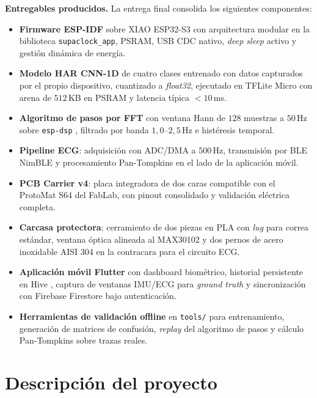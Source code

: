 \documentclass[letterpaper,11pt]{article}
\begin{document}
\vspace{0.2cm}
\noindent\textbf{Entregables producidos.} La entrega final consolida los siguientes componentes:
\begin{itemize}
    \item \textbf{Firmware ESP-IDF} sobre XIAO ESP32-S3 con arquitectura modular en la biblioteca \texttt{supaclock\_app}, PSRAM, USB CDC nativo, \textit{deep sleep} activo y gesti\'on din\'amica de energ\'ia.
    \item \textbf{Modelo HAR CNN-1D} de cuatro clases entrenado con datos capturados por el propio dispositivo, cuantizado a \textit{float32}, ejecutado en TFLite Micro con arena de $512$\,KB en PSRAM y latencia t\'ipica $<10$\,ms.
    \item \textbf{Algoritmo de pasos por FFT} con ventana Hann de $128$ muestras a $50$\,Hz sobre \texttt{esp-dsp} \cite{esp_dsp}, filtrado por banda $1{,}0$--$2{,}5$\,Hz e hist\'eresis temporal.
    \item \textbf{Pipeline ECG}: adquisici\'on con ADC/DMA a $500$\,Hz, transmisi\'on por BLE NimBLE \cite{nimble_ref} y procesamiento Pan-Tompkins \cite{pan_tompkins} en el lado de la aplicaci\'on m\'ovil.
    \item \textbf{PCB Carrier v4}: placa integradora de dos caras compatible con el ProtoMat S64 del FabLab, con pinout consolidado y validaci\'on el\'ectrica completa.
    \item \textbf{Carcasa protectora}: cerramiento de dos piezas en PLA con \textit{lug} para correa est\'andar, ventana \'optica alineada al MAX30102 y dos pernos de acero inoxidable AISI 304 en la contracara para el circuito ECG.
    \item \textbf{Aplicaci\'on m\'ovil Flutter} con dashboard biom\'etrico, historial persistente en Hive \cite{hive_db}, captura de ventanas IMU/ECG para \textit{ground truth} y sincronizaci\'on con Firebase Firestore bajo autenticaci\'on.
    \item \textbf{Herramientas de validaci\'on offline} en \texttt{tools/} para entrenamiento, generaci\'on de matrices de confusi\'on, \textit{replay} del algoritmo de pasos y c\'alculo Pan-Tompkins sobre trazas reales.
\end{itemize}

\newpage

\section{Descripci\'on del proyecto}\label{sec:contexto}
\end{document}
